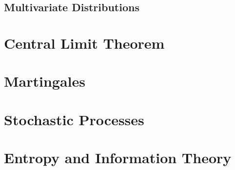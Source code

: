 \subsection{Multivariate Distributions}




\section{Central Limit Theorem}






\section{Martingales}







\section{Stochastic Processes}






\section{Entropy and Information Theory}








